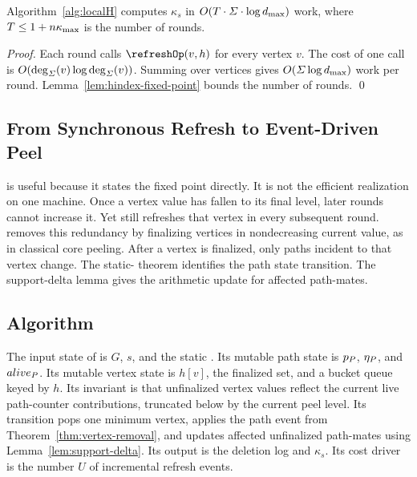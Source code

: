 \begin{theorem}\label{thm:localh-complexity}
Algorithm~\ref{alg:localH} computes \(\kappa_s\) in \(O(T\cdot\varSigma\cdot\log d_{\max})\) work, where \(T\le1+n\kappa_{\max}\) is the number of rounds.
\end{theorem}

\begin{proof}
Each round calls \(\refreshOp(v,h)\) for every vertex \(v\).
%
The cost of one call is \(O(\deg_{\varSigma}(v)\log\deg_{\varSigma}(v))\).
%
Summing over vertices gives \(O(\varSigma\log d_{\max})\) work per round.
%
Lemma~\ref{lem:hindex-fixed-point} bounds the number of rounds.
%
\qed
\end{proof}

\subsection{From Synchronous Refresh to Event-Driven Peel}\label{sec:redundancy}

\localH{} is useful because it states the fixed point directly.
%
It is not the efficient realization on one machine.
%
Once a vertex value has fallen to its final level, later rounds cannot increase it.
%
Yet \localH{} still refreshes that vertex in every subsequent round.
%
\peelH{} removes this redundancy by finalizing vertices in nondecreasing current value, as in classical core peeling.
%
After a vertex is finalized, only paths incident to that vertex change.
%
The static-\cpi{} theorem identifies the path state transition.
%
The support-delta lemma gives the arithmetic update for affected path-mates.

\subsection{Algorithm \peelH}\label{sec:peelh}

The input state of \peelH{} is \(G\), \(s\), and the static \cpi{}.
%
Its mutable path state is \(p_{\TPath}\), \(\eta_{\TPath}\), and \(alive_{\TPath}\).
%
Its mutable vertex state is \(h[v]\), the finalized set, and a bucket queue keyed by \(h\).
%
Its invariant is that unfinalized vertex values reflect the current live path-counter contributions, truncated below by the current peel level.
%
Its transition pops one minimum vertex, applies the path event from Theorem~\ref{thm:vertex-removal}, and updates affected unfinalized path-mates using Lemma~\ref{lem:support-delta}.
%
Its output is the deletion log and \(\kappa_s\).
%
Its cost driver is the number \(U\) of incremental refresh events.

